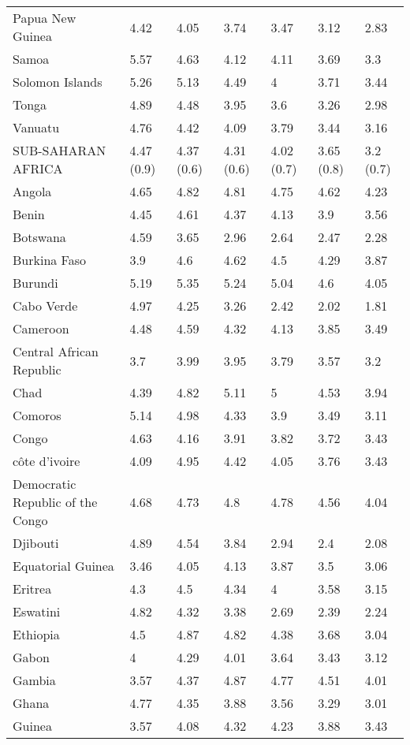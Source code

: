 \begin{longtable}[t]{lllllll}
Papua New Guinea & 4.42 & 4.05 & 3.74 & 3.47 & 3.12 & 2.83\\
Samoa & 5.57 & 4.63 & 4.12 & 4.11 & 3.69 & 3.3\\
Solomon Islands & 5.26 & 5.13 & 4.49 & 4 & 3.71 & 3.44\\
Tonga & 4.89 & 4.48 & 3.95 & 3.6 & 3.26 & 2.98\\
Vanuatu & 4.76 & 4.42 & 4.09 & 3.79 & 3.44 & 3.16\\
SUB-SAHARAN AFRICA & 4.47 (0.9) & 4.37 (0.6) & 4.31 (0.6) & 4.02 (0.7) & 3.65 (0.8) & 3.2 (0.7)\\
Angola & 4.65 & 4.82 & 4.81 & 4.75 & 4.62 & 4.23\\
Benin & 4.45 & 4.61 & 4.37 & 4.13 & 3.9 & 3.56\\
Botswana & 4.59 & 3.65 & 2.96 & 2.64 & 2.47 & 2.28\\
Burkina Faso & 3.9 & 4.6 & 4.62 & 4.5 & 4.29 & 3.87\\
Burundi & 5.19 & 5.35 & 5.24 & 5.04 & 4.6 & 4.05\\
Cabo Verde & 4.97 & 4.25 & 3.26 & 2.42 & 2.02 & 1.81\\
Cameroon & 4.48 & 4.59 & 4.32 & 4.13 & 3.85 & 3.49\\
Central African Republic & 3.7 & 3.99 & 3.95 & 3.79 & 3.57 & 3.2\\
Chad & 4.39 & 4.82 & 5.11 & 5 & 4.53 & 3.94\\
Comoros & 5.14 & 4.98 & 4.33 & 3.9 & 3.49 & 3.11\\
Congo & 4.63 & 4.16 & 3.91 & 3.82 & 3.72 & 3.43\\
côte d'ivoire & 4.09 & 4.95 & 4.42 & 4.05 & 3.76 & 3.43\\
Democratic Republic of the Congo & 4.68 & 4.73 & 4.8 & 4.78 & 4.56 & 4.04\\
Djibouti & 4.89 & 4.54 & 3.84 & 2.94 & 2.4 & 2.08\\
Equatorial Guinea & 3.46 & 4.05 & 4.13 & 3.87 & 3.5 & 3.06\\
Eritrea & 4.3 & 4.5 & 4.34 & 4 & 3.58 & 3.15\\
Eswatini & 4.82 & 4.32 & 3.38 & 2.69 & 2.39 & 2.24\\
Ethiopia & 4.5 & 4.87 & 4.82 & 4.38 & 3.68 & 3.04\\
Gabon & 4 & 4.29 & 4.01 & 3.64 & 3.43 & 3.12\\
Gambia & 3.57 & 4.37 & 4.87 & 4.77 & 4.51 & 4.01\\
Ghana & 4.77 & 4.35 & 3.88 & 3.56 & 3.29 & 3.01\\
Guinea & 3.57 & 4.08 & 4.32 & 4.23 & 3.88 & 3.43\\

\end{longtable}
